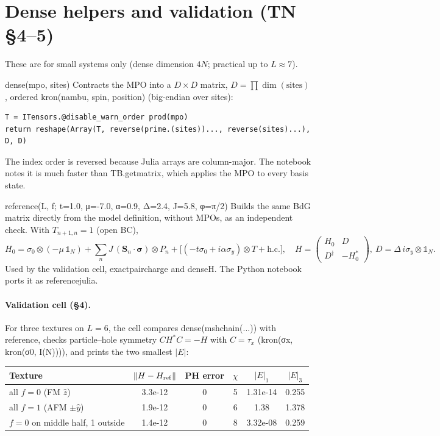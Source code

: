\documentclass[11pt]{article}
\newcommand{\codeus}{\textunderscore\allowbreak}
\renewcommand{\code}[1]{{\ttfamily\let\_\codeus #1}}
\begin{document}
\section{Dense helpers and validation (TN §4–5)}

These are for small systems only (dense dimension $4N$; practical up to $L\approx7$).

\begin{function}{dense(mpo, sites)}
Contracts the MPO into a $D\times D$ matrix, $D=\prod\dim(\text{sites})$, ordered \code{kron(nambu, spin, position)} (big-endian over \code{sites}):
\begin{Verbatim}
T = ITensors.@disable_warn_order prod(mpo)
return reshape(Array(T, reverse(prime.(sites))..., reverse(sites)...), D, D)
\end{Verbatim}
The index order is reversed because Julia arrays are column-major. The notebook notes it is much faster than \code{TB.get\_matrix}, which applies the MPO to every basis state.
\end{function}

\begin{function}{reference(L, f; t=1.0, μ=-7.0, α=0.9, Δ=2.4, J=5.8, φ=π/2)}
Builds the same BdG matrix directly from the model definition, without MPOs, as an independent check. With $T_{n+1,n}=1$ (open BC),
\[
H_0=\sigma_0\otimes(-\mu\,\mathbb 1_N)+\sum_n J\,(\mathbf S_n\cdot\boldsymbol\sigma)\otimes P_n+\bigl[(-t\sigma_0+i\alpha\sigma_y)\otimes T+\text{h.c.}\bigr],\quad
H=\begin{pmatrix}H_0 & D\\ D^\dagger & -H_0^*\end{pmatrix},\ D=\Delta\,i\sigma_y\otimes\mathbb 1_N .
\]
Used by the validation cell, \code{exact\_pair\_charge} and \code{dense\_H}. The Python notebook ports it as \code{reference\_julia}.
\end{function}

\paragraph{Validation cell (§4).} For three textures on $L=6$, the cell compares \code{dense(msh\_chain(...))} with \code{reference}, checks particle–hole symmetry $CH^*C=-H$ with $C=\tau_x$ (\code{kron(σx, kron(σ0, I(N)))}), and prints the two smallest $|E|$:

\begin{table}[H]
\centering\small
\begin{tabular}{lccccc}
\toprule
Texture & $\|H-H_{\rm ref}\|$ & PH error & $\chi$ & $|E|_1$ & $|E|_3$\\
\midrule
all $f=0$ (FM $\hat z$) & 3.3e-12 & 0 & 5 & 1.31e-14 & 0.255\\
all $f=1$ (AFM $\pm\hat y$) & 1.9e-12 & 0 & 6 & 1.38 & 1.378\\
$f=0$ on middle half, 1 outside & 1.4e-12 & 0 & 8 & 3.32e-08 & 0.259\\
\bottomrule
\end{tabular}
\end{table}
\end{document}

